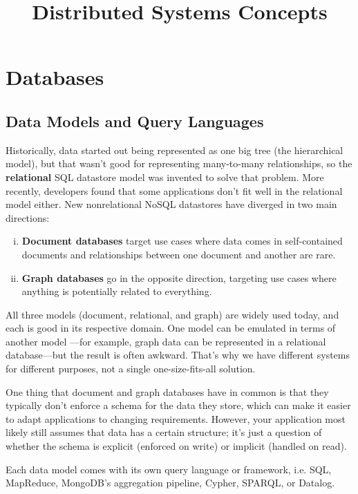 \documentclass{article}
\title{\vspace{-3cm} Distributed Systems Concepts}
\author{}
\date{}
\begin{document}
\maketitle
\vspace{-1.5cm}
\tableofcontents
\newpage

\section{Databases}
    \subsection{Data Models and Query Languages}
    Historically, data started out being represented as one big tree (the hierarchical model), but that wasn’t good for representing many-to-many relationships, so the \textbf{relational} SQL datastore model was invented to solve that problem. More recently, developers found that some applications don’t fit well in the relational model either. New nonrelational NoSQL datastores have diverged in two main directions:
    \begin{enumerate}[i.]
        \item \textbf{Document databases} target use cases where data comes in self-contained documents and relationships between one document and another are rare.
        \item \textbf{Graph databases} go in the opposite direction, targeting use cases where anything is potentially related to everything.
    \end{enumerate}
    
    All three models (document, relational, and graph) are widely used today, and each is good in its respective domain. One model can be emulated in terms of another model —for example, graph data can be represented in a relational database—but the result is often awkward. That’s why we have different systems for different purposes, not a single one-size-fits-all solution.
    
    One thing that document and graph databases have in common is that they typically don’t enforce a schema for the data they store, which can make it easier to adapt applications to changing requirements. However, your application most likely still assumes that data has a certain structure; it’s just a question of whether the schema is explicit (enforced on write) or implicit (handled on read).
    
    Each data model comes with its own query language or framework, i.e. SQL, MapReduce, MongoDB’s aggregation pipeline, Cypher, SPARQL, or Datalog. 
    
\end{document}
